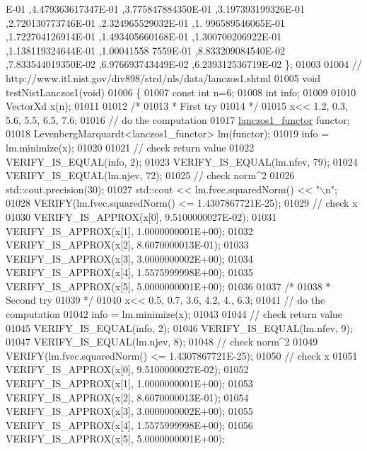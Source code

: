\begin{DoxyCode}
      E-01 ,4.479363617347E-01 ,3.775847884350E-01 ,3.197393199326E-01 ,2.720130773746E-01 ,2.324965529032E-01 ,1.
      996589546065E-01 ,1.722704126914E-01 ,1.493405660168E-01 ,1.300700206922E-01 ,1.138119324644E-01 ,1.00041558
      7559E-01 ,8.833209084540E-02 ,7.833544019350E-02 ,6.976693743449E-02 ,6.239312536719E-02 \};
01003 
01004 \textcolor{comment}{// http://www.itl.nist.gov/div898/strd/nls/data/lanczos1.shtml}
01005 \textcolor{keywordtype}{void} testNistLanczos1(\textcolor{keywordtype}{void})
01006 \{
01007   \textcolor{keyword}{const} \textcolor{keywordtype}{int} n=6;
01008   \textcolor{keywordtype}{int} info;
01009 
01010   VectorXd x(n);
01011 
01012   \textcolor{comment}{/*}
01013 \textcolor{comment}{   * First try}
01014 \textcolor{comment}{   */}
01015   x<< 1.2, 0.3, 5.6, 5.5, 6.5, 7.6;
01016   \textcolor{comment}{// do the computation}
01017   \hyperlink{structlanczos1__functor}{lanczos1\_functor} functor;
01018   LevenbergMarquardt<lanczos1\_functor> lm(functor);
01019   info = lm.minimize(x);
01020 
01021   \textcolor{comment}{// check return value}
01022   VERIFY\_IS\_EQUAL(info, 2);
01023   VERIFY\_IS\_EQUAL(lm.nfev, 79);
01024   VERIFY\_IS\_EQUAL(lm.njev, 72);
01025   \textcolor{comment}{// check norm^2}
01026   std::cout.precision(30);
01027   std::cout << lm.fvec.squaredNorm() << \textcolor{stringliteral}{"\(\backslash\)n"};
01028   VERIFY(lm.fvec.squaredNorm() <= 1.4307867721E-25);
01029   \textcolor{comment}{// check x}
01030   VERIFY\_IS\_APPROX(x[0], 9.5100000027E-02);
01031   VERIFY\_IS\_APPROX(x[1], 1.0000000001E+00);
01032   VERIFY\_IS\_APPROX(x[2], 8.6070000013E-01);
01033   VERIFY\_IS\_APPROX(x[3], 3.0000000002E+00);
01034   VERIFY\_IS\_APPROX(x[4], 1.5575999998E+00);
01035   VERIFY\_IS\_APPROX(x[5], 5.0000000001E+00);
01036 
01037   \textcolor{comment}{/*}
01038 \textcolor{comment}{   * Second try}
01039 \textcolor{comment}{   */}
01040   x<< 0.5, 0.7, 3.6, 4.2, 4., 6.3;
01041   \textcolor{comment}{// do the computation}
01042   info = lm.minimize(x);
01043 
01044   \textcolor{comment}{// check return value}
01045   VERIFY\_IS\_EQUAL(info, 2);
01046   VERIFY\_IS\_EQUAL(lm.nfev, 9);
01047   VERIFY\_IS\_EQUAL(lm.njev, 8);
01048   \textcolor{comment}{// check norm^2}
01049   VERIFY(lm.fvec.squaredNorm() <= 1.4307867721E-25);
01050   \textcolor{comment}{// check x}
01051   VERIFY\_IS\_APPROX(x[0], 9.5100000027E-02);
01052   VERIFY\_IS\_APPROX(x[1], 1.0000000001E+00);
01053   VERIFY\_IS\_APPROX(x[2], 8.6070000013E-01);
01054   VERIFY\_IS\_APPROX(x[3], 3.0000000002E+00);
01055   VERIFY\_IS\_APPROX(x[4], 1.5575999998E+00);
01056   VERIFY\_IS\_APPROX(x[5], 5.0000000001E+00);

\end{DoxyCode}
